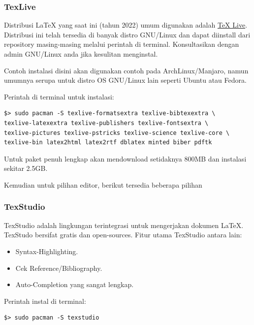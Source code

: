 \documentclass{book} %
\begin{document}
	\subsubsection{TexLive}

	Distribusi \LaTeX{} yang saat ini (tahun 2022) umum digunakan adalah \href{https://www.tug.org/texlive/}{TeX Live}.
	Distribusi ini telah tersedia di banyak distro GNU/Linux dan dapat diinstall dari repository masing-masing melalui perintah di terminal.
	Konsultasikan dengan admin GNU/Linux anda jika kesulitan menginstal.

	Contoh instalasi disini akan digunakan contoh pada ArchLinux/Manjaro, namun umumnya serupa untuk distro OS GNU/Linux lain seperti Ubuntu atau Fedora.

	Perintah di terminal untuk instalasi:
	\begin{verbatim}
$> sudo pacman -S texlive-formatsextra texlive-bibtexextra \
texlive-latexextra texlive-publishers texlive-fontsextra \
texlive-pictures texlive-pstricks texlive-science texlive-core \
texlive-bin latex2html latex2rtf dblatex minted biber pdftk
	\end{verbatim}

	Untuk paket penuh lengkap akan mendownload setidaknya 800MB dan instalasi sekitar 2.5GB.

	\bigskip

	Kemudian untuk pilihan editor, berikut tersedia beberapa pilihan

	\subsubsection{TexStudio}

	TexStudio adalah lingkungan terintegrasi untuk mengerjakan dokumen \LaTeX{}.
	TexStudo bersifat gratis dan open-sources.
	Fitur utama TexStudio antara lain:
	\begin{itemize}
		\item Syntax-Highlighting.
		\item Cek Reference/Bibliography.
		\item Auto-Completion yang sangat lengkap.
	\end{itemize}

	Perintah instal di terminal:

	\begin{verbatim}
$> sudo pacman -S texstudio
	\end{verbatim}
\end{document}
